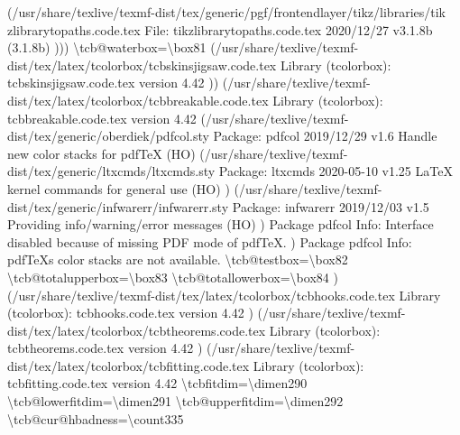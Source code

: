 \documentclass[
  letterpaper,
  DIV=11,
  numbers=noendperiod]{scrartcl}
\newenvironment{Shaded}{\begin{snugshade}}{\end{snugshade}}
\newcommand{\NormalTok}[1]{\textcolor[rgb]{0.00,0.23,0.31}{#1}}
\begin{document}
\begin{Shaded}
\begin{Highlighting}[]
\NormalTok{(/usr/share/texlive/texmf{-}dist/tex/generic/pgf/frontendlayer/tikz/libraries/tik}
\NormalTok{zlibrarytopaths.code.tex}
\NormalTok{File: tikzlibrarytopaths.code.tex 2020/12/27 v3.1.8b (3.1.8b)}
\NormalTok{)))}
\NormalTok{\textbackslash{}tcb@waterbox=\textbackslash{}box81}
\NormalTok{(/usr/share/texlive/texmf{-}dist/tex/latex/tcolorbox/tcbskinsjigsaw.code.tex}
\NormalTok{Library (tcolorbox): \textquotesingle{}tcbskinsjigsaw.code.tex\textquotesingle{} version \textquotesingle{}4.42\textquotesingle{}}
\NormalTok{)) (/usr/share/texlive/texmf{-}dist/tex/latex/tcolorbox/tcbbreakable.code.tex}
\NormalTok{Library (tcolorbox): \textquotesingle{}tcbbreakable.code.tex\textquotesingle{} version \textquotesingle{}4.42\textquotesingle{}}
\NormalTok{(/usr/share/texlive/texmf{-}dist/tex/generic/oberdiek/pdfcol.sty}
\NormalTok{Package: pdfcol 2019/12/29 v1.6 Handle new color stacks for pdfTeX (HO)}
\NormalTok{(/usr/share/texlive/texmf{-}dist/tex/generic/ltxcmds/ltxcmds.sty}
\NormalTok{Package: ltxcmds 2020{-}05{-}10 v1.25 LaTeX kernel commands for general use (HO)}
\NormalTok{) (/usr/share/texlive/texmf{-}dist/tex/generic/infwarerr/infwarerr.sty}
\NormalTok{Package: infwarerr 2019/12/03 v1.5 Providing info/warning/error messages (HO)}
\NormalTok{)}
\NormalTok{Package pdfcol Info: Interface disabled because of missing PDF mode of pdfTeX.}
\NormalTok{)}
\NormalTok{Package pdfcol Info: pdfTeX\textquotesingle{}s color stacks are not available.}
\NormalTok{\textbackslash{}tcb@testbox=\textbackslash{}box82}
\NormalTok{\textbackslash{}tcb@totalupperbox=\textbackslash{}box83}
\NormalTok{\textbackslash{}tcb@totallowerbox=\textbackslash{}box84}
\NormalTok{) (/usr/share/texlive/texmf{-}dist/tex/latex/tcolorbox/tcbhooks.code.tex}
\NormalTok{Library (tcolorbox): \textquotesingle{}tcbhooks.code.tex\textquotesingle{} version \textquotesingle{}4.42\textquotesingle{}}
\NormalTok{) (/usr/share/texlive/texmf{-}dist/tex/latex/tcolorbox/tcbtheorems.code.tex}
\NormalTok{Library (tcolorbox): \textquotesingle{}tcbtheorems.code.tex\textquotesingle{} version \textquotesingle{}4.42\textquotesingle{}}
\NormalTok{) (/usr/share/texlive/texmf{-}dist/tex/latex/tcolorbox/tcbfitting.code.tex}
\NormalTok{Library (tcolorbox): \textquotesingle{}tcbfitting.code.tex\textquotesingle{} version \textquotesingle{}4.42\textquotesingle{}}
\NormalTok{\textbackslash{}tcbfitdim=\textbackslash{}dimen290}
\NormalTok{\textbackslash{}tcb@lowerfitdim=\textbackslash{}dimen291}
\NormalTok{\textbackslash{}tcb@upperfitdim=\textbackslash{}dimen292}
\NormalTok{\textbackslash{}tcb@cur@hbadness=\textbackslash{}count335}

\end{Highlighting}
\end{Shaded}
\end{document}
